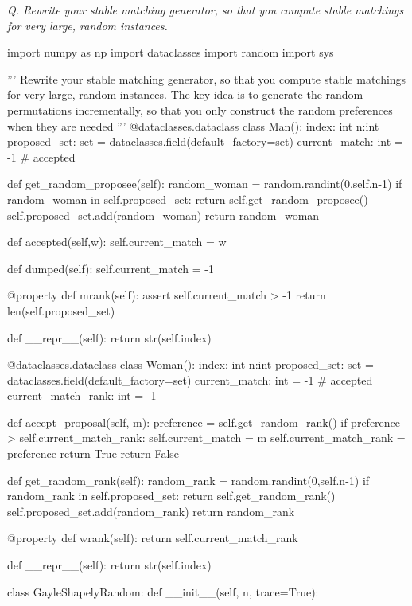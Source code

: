 \documentclass{homeworg}
\begin{document}
\newpage
\exercise
\emph{Q. Rewrite your stable matching generator, so that you compute stable matchings for very large, random instances.}
\begin{python}
import numpy as np
import dataclasses
import random
import sys

'''
Rewrite your stable matching generator, so that you compute stable matchings for very large, random instances. The key idea is to generate the random permutations incrementally, so that you only construct the random preferences when they are needed
'''
@dataclasses.dataclass
class Man():
    index: int
    n:int
    proposed_set: set = dataclasses.field(default_factory=set)
    current_match: int = -1  # accepted

    def get_random_proposee(self):
        random_woman = random.randint(0,self.n-1)
        if random_woman in self.proposed_set:
            return self.get_random_proposee()
        self.proposed_set.add(random_woman)
        return random_woman

    def accepted(self,w):
        self.current_match = w

    def dumped(self):
        self.current_match = -1

    @property
    def mrank(self):
        assert self.current_match > -1
        return len(self.proposed_set)

    def __repr__(self):
        return str(self.index)

@dataclasses.dataclass
class Woman():
    index: int
    n:int
    proposed_set: set = dataclasses.field(default_factory=set)
    current_match: int = -1  # accepted
    current_match_rank: int = -1

    def accept_proposal(self, m):
        preference = self.get_random_rank()
        if preference > self.current_match_rank:
            self.current_match = m
            self.current_match_rank = preference
            return True
        return False

    def get_random_rank(self):
        random_rank = random.randint(0,self.n-1)
        if random_rank in self.proposed_set:
            return self.get_random_rank()
        self.proposed_set.add(random_rank)
        return random_rank

    @property
    def wrank(self):
        return self.current_match_rank
    
    
    def __repr__(self):
        return str(self.index)


class GayleShapelyRandom:
    def __init__(self, n, trace=True):


\end{python}
\end{document}
